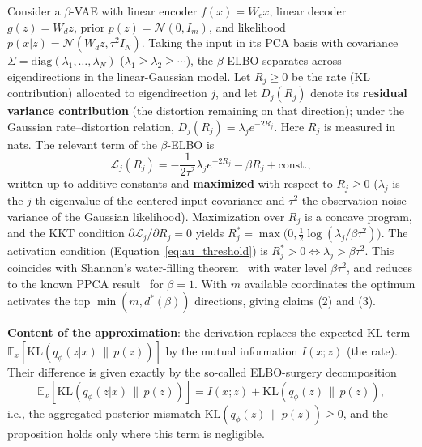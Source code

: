 \documentclass[make,article,submit,pdftex,moreauthors]{Definitions/mdpi}
\newcommand{\dstar}{d^{*}(\beta)}
\begin{document}
Consider a $\beta$-VAE with linear encoder $f(x) = W_e x$, linear decoder
$g(z) = W_d z$, prior $p(z) = \mathcal{N}(0, I_m)$, and likelihood
$p(x|z) = \mathcal{N}(W_d z, \tau^2 I_N)$.
Taking the input in its PCA basis with covariance
$\Sigma = \mathrm{diag}(\lambda_1, \ldots, \lambda_N)$
($\lambda_1 \geq \lambda_2 \geq \cdots$), the $\beta$-ELBO separates across
eigendirections in the linear-Gaussian model.
Let $R_j \geq 0$ be the rate (KL contribution) allocated to eigendirection
$j$, and let $D_j(R_j)$ denote its \textbf{residual variance contribution}
(the distortion remaining on that direction); under the Gaussian
rate--distortion relation, $D_j(R_j) = \lambda_j e^{-2R_j}$.
Here $R_j$ is measured in nats.
The relevant term of the $\beta$-ELBO is
\begin{equation}
  \mathcal{L}_j(R_j) = -\frac{1}{2\tau^2}\lambda_j e^{-2R_j} - \beta R_j + \text{const.},
\end{equation}
written up to additive constants and \textbf{maximized} with respect to
$R_j \geq 0$ ($\lambda_j$ is the $j$-th eigenvalue of the centered input
covariance and $\tau^2$ the observation-noise variance of the Gaussian
likelihood).
Maximization over $R_j$ is a concave program, and the KKT condition
$\partial \mathcal{L}_j / \partial R_j = 0$ yields
$R_j^* = \max\bigl(0, \tfrac{1}{2}\log(\lambda_j / \beta\tau^2)\bigr)$.
The activation condition (Equation~\eqref{eq:au_threshold}) is
$R_j^* > 0 \iff \lambda_j > \beta\tau^2$.
This coincides with Shannon's water-filling theorem~\cite{cover2006elements}
with water level $\beta\tau^2$, and reduces to the known PPCA
result~\cite{tippingbishop1999ppca} for $\beta = 1$.
With $m$ available coordinates the optimum activates the top
$\min(m, \dstar)$ directions, giving claims (2) and (3).

\textbf{Content of the approximation}: the derivation replaces the expected
KL term $\mathbb{E}_x[\mathrm{KL}(q_\phi(z|x)\,\|\,p(z))]$ by the mutual
information $I(x; z)$ (the rate).
Their difference is given exactly by the so-called ELBO-surgery
decomposition~\cite{hoffman2016elbo}
\begin{equation}
  \mathbb{E}_x[\mathrm{KL}(q_\phi(z|x)\,\|\,p(z))]
  = I(x; z) + \mathrm{KL}(q_\phi(z)\,\|\,p(z)),
  \label{eq:elbo_surgery}
\end{equation}
i.e., the aggregated-posterior mismatch
$\mathrm{KL}(q_\phi(z)\,\|\,p(z)) \geq 0$, and the proposition holds only
where this term is negligible.
\end{document}
